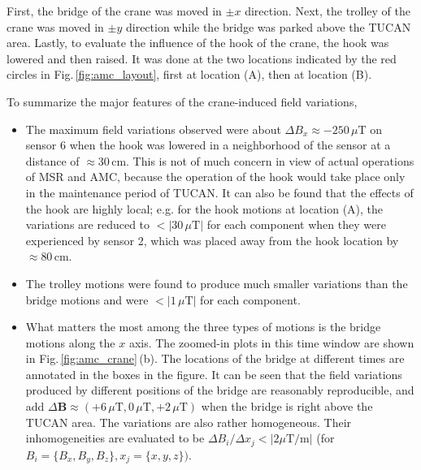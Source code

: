  First, the bridge of the crane was moved in $\pm x$ direction. Next, the trolley of the crane was moved in $\pm y$ direction while the bridge was parked above the TUCAN area. Lastly, to evaluate the influence of the hook of the crane, the hook was lowered and then raised. It was done at the two locations indicated by the red circles in Fig.\,\ref{fig:amc_layout}, first at  location (A), then at  location (B). 

To summarize the major features of the crane-induced field variations,
\begin{itemize}
\item The maximum field variations observed were about $\Delta B_{x}\approx -250\,\mu$T on sensor 6 when the hook was lowered in a neighborhood of the sensor at a distance of $\approx 30\,$cm. This is not of much concern in view of actual operations of MSR and AMC, because the operation of the hook would take place only in the maintenance period of TUCAN. It can also be found that the effects of the hook are highly local; e.g. for the hook motions at location (A), the variations are reduced to $<\left|30\,\mu\mathrm{T}\right|$ for each component when they were experienced by sensor 2, which was placed away from the hook location by $\approx 80\,$cm.
\item The trolley motions were found to produce much smaller variations than the bridge motions and were $<|1\,\mu\mathrm{T}|$ for each component. 
\item What matters the most among the three types of motions is the bridge motions along the $x$ axis. The zoomed-in plots in this time window are shown in Fig.\,\ref{fig:amc_crane}\,(b). The locations of the bridge at different times are annotated in the boxes in the figure. It can be seen that the field variations produced by different positions of the bridge are reasonably reproducible, and add $\Delta \mathbf{B}\approx (+6\,\mu\mathrm{T}, 0\,\mu\mathrm{T},+2\,\mu\mathrm{T})$ when the bridge is right above the TUCAN area. The variations are also rather homogeneous. Their inhomogeneities are evaluated to be $\Delta B_{i}/\Delta x_{j} < \left|2 \mu \mathrm{T}/ \mathrm{m}\right|$ (for $B_{i}= \{B_{x}, B_{y}, B_{z}\}, x_{j}=\{x,y,z\})$.
\end{itemize}

